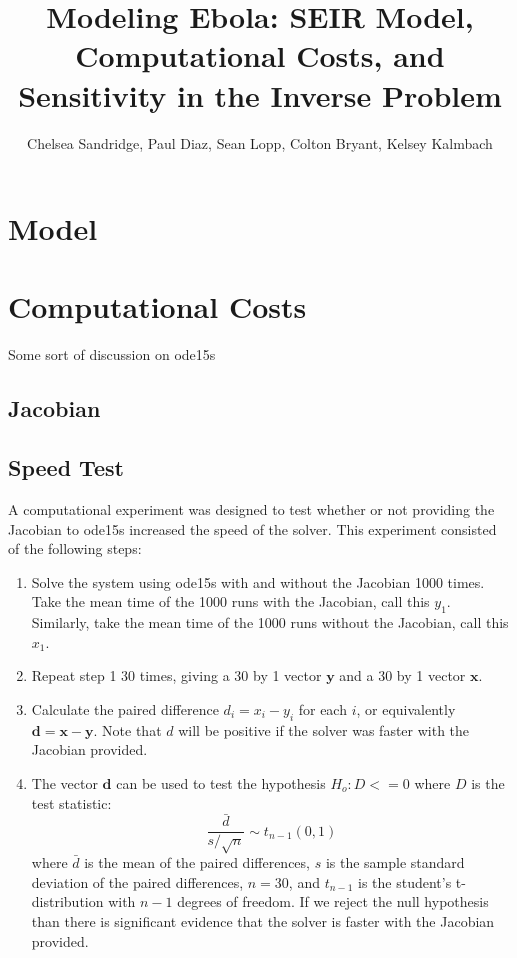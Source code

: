 \documentclass[10pt,a4paper]{article}
\author{Chelsea Sandridge, Paul Diaz, Sean Lopp, Colton Bryant, Kelsey Kalmbach}
\title{Modeling Ebola: SEIR Model, Computational Costs, and  Sensitivity in the Inverse Problem}
\begin{document}
\maketitle

\section*{Model}


\section*{Computational Costs}

Some sort of discussion on ode15s

\subsection*{Jacobian}


\subsection*{Speed Test}
A computational experiment was designed to test whether or not providing the Jacobian to ode15s increased the speed of the solver. This experiment consisted of the following steps:

\begin{enumerate}
\item Solve the system using ode15s with and without the Jacobian 1000 times. Take the mean time of the 1000 runs with the Jacobian, call this $y_1$. Similarly, take the mean time of the 1000 runs without the Jacobian, call this $x_1$.
\item Repeat step 1 30 times, giving a 30 by 1 vector $\mathbf{y}$ and a 30 by 1 vector $\mathbf{x}$.
\item Calculate the paired difference $d_i =x_i - y_i$ for each $i$, or equivalently $\mathbf{d=x-y}$. Note that $d$ will be positive if the solver was faster with the Jacobian provided.
\item The vector $\mathbf{d}$ can be used to test the hypothesis
$ H_o: D <= 0$ where $D$ is the test statistic:
$$ \frac{\bar{d}}{s/\sqrt{n}} \sim t_{n-1}(0,1)$$
where $\bar{d}$ is the mean of the paired differences, $s$ is the  sample standard deviation of the paired differences, $n=30$, and $t_{n-1}$ is the student's t-distribution with $n-1$ degrees of freedom. If we reject the null hypothesis than there is significant evidence that the solver is faster with the Jacobian provided.
\end{enumerate}
\end{document}

